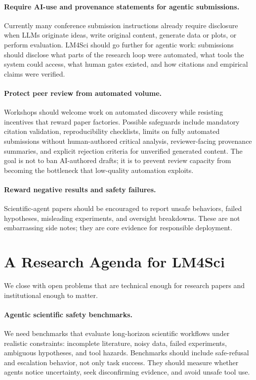 \documentclass{article}
\begin{document}
\paragraph{Require AI-use and provenance statements for agentic submissions.} Currently many conference submission instructions already require disclosure when LLMs originate ideas, write original content, generate data or plots, or perform evaluation. LM4Sci should go further for agentic work: submissions should disclose what parts of the research loop were automated, what tools the system could access, what human gates existed, and how citations and empirical claims were verified.

\paragraph{Protect peer review from automated volume.} Workshops should welcome work on automated discovery while resisting incentives that reward paper factories. Possible safeguards include mandatory citation validation, reproducibility checklists, limits on fully automated submissions without human-authored critical analysis, reviewer-facing provenance summaries, and explicit rejection criteria for unverified generated content. The goal is not to ban AI-authored drafts; it is to prevent review capacity from becoming the bottleneck that low-quality automation exploits.

\paragraph{Reward negative results and safety failures.} Scientific-agent papers should be encouraged to report unsafe behaviors, failed hypotheses, misleading experiments, and oversight breakdowns. These are not embarrassing side notes; they are core evidence for responsible deployment.

\section{A Research Agenda for LM4Sci}

We close with open problems that are technical enough for research papers and institutional enough to matter.

\paragraph{Agentic scientific safety benchmarks.} We need benchmarks that evaluate long-horizon scientific workflows under realistic constraints: incomplete literature, noisy data, failed experiments, ambiguous hypotheses, and tool hazards. Benchmarks should include safe-refusal and escalation behavior, not only task success. They should measure whether agents notice uncertainty, seek disconfirming evidence, and avoid unsafe tool use.
\end{document}
